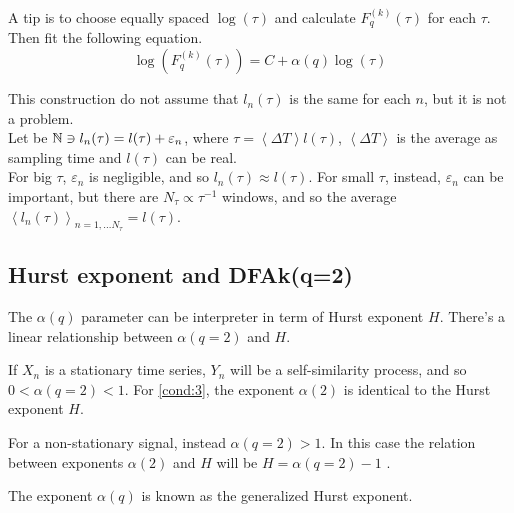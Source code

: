 A tip is to choose equally spaced $\log(\tau)$ and calculate $F_q^{( k )}(\tau )$ for each $\tau$. Then fit the following equation.
\begin{equation}
	\log(F_q^{( k )}(\tau )) = C + \alpha(q) \log(\tau)
\end{equation}

This construction do not assume that $l_n(\tau)$ is the same for each $n$, but it is not a problem. \\
Let be $\mathbb{N} \ni l_n(\tau) = l(\tau) + \varepsilon_n$, where $\tau = \left< \Delta T\right> l(\tau)$, $\left< \Delta T\right>$ is the average as sampling time and $l(\tau)$ can be real. \\
For big $\tau$, $\varepsilon_n$ is negligible, and so $l_n(\tau) \approx l(\tau)$. For small $\tau$, instead, $\varepsilon_n$ can be important, but there are $N_{\tau} \propto \tau^{-1}$ windows, and so the average $\left< l_n(\tau) \right>_{n = 1, \dots N_{\tau}} = l(\tau)$.

\subsection{Hurst exponent and DFAk(q=2)}
The $\alpha(q)$ parameter can be interpreter in term of Hurst exponent $H$. There's a linear relationship between $\alpha(q=2)$ and $H$.

If $X_n$ is a stationary time series, $Y_n$ will be a self-similarity process, and so $0 < \alpha(q = 2) < 1$. For \autoref{cond:3}, the exponent $\alpha(2)$ is identical to the Hurst exponent $H$.

For a non-stationary signal, instead $\alpha(q = 2) > 1$. In this case the relation between exponents $\alpha(2)$ and $H$ will be $H = \alpha(q = 2)-1$ \cite{Movahed_2006}.  

The exponent $\alpha(q)$ is known as the generalized Hurst exponent.